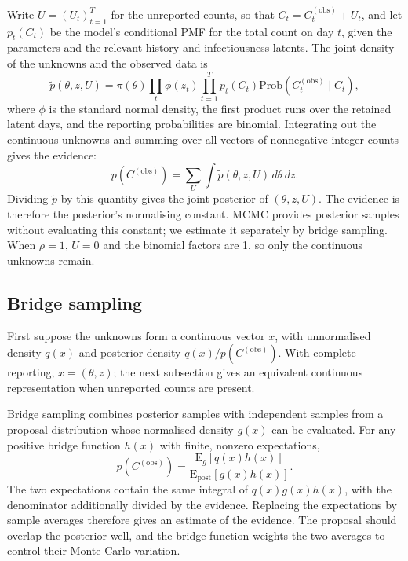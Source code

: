 \documentclass{article}
\newcommand{\Prob}[1]{\mathrm{Prob}\left(#1\right)}
\begin{document}
Write \(U=(U_t)_{t=1}^{T}\) for the unreported counts, so that
\(C_t=C_t^{(\mathrm{obs})}+U_t\), and let \(p_t(C_t)\) be the model's
conditional PMF for the total count on day \(t\), given the parameters and
the relevant history and infectiousness latents. The joint density of the
unknowns and the observed data is
\begin{equation}
  \tilde p(\theta,z,U)=\pi(\theta)\prod_t\phi(z_t)
  \prod_{t=1}^{T}p_t(C_t)\Prob{C_t^{(\mathrm{obs})}\mid C_t},
\end{equation}
where \(\phi\) is the standard normal density, the first product runs over
the retained latent days, and the reporting probabilities are binomial.
Integrating out the continuous unknowns and summing over all vectors of
nonnegative integer counts gives the evidence:
\begin{equation}
  p\left(C^{(\mathrm{obs})}\right)
  =\sum_U\int\tilde p(\theta,z,U)\,d\theta\,dz.
\end{equation}
Dividing \(\tilde p\) by this quantity gives the joint posterior of
\((\theta,z,U)\). The evidence is therefore the posterior's normalising
constant. MCMC provides posterior samples without evaluating this constant;
we estimate it separately by bridge sampling. When \(\rho=1\), \(U=0\)
and the binomial factors are 1, so only the continuous unknowns remain.

\subsection{Bridge sampling}

First suppose the unknowns form a continuous vector \(x\), with
unnormalised density \(q(x)\) and posterior density
\(q(x)/p(C^{(\mathrm{obs})})\). With complete reporting,
\(x=(\theta,z)\); the next subsection gives an equivalent continuous
representation when unreported counts are present.

Bridge sampling combines posterior samples with independent samples from a
proposal distribution whose normalised density \(g(x)\) can be evaluated.
For any positive bridge function \(h(x)\) with finite, nonzero expectations,
\begin{equation}
  p\left(C^{(\mathrm{obs})}\right)
  =\frac{\mathrm{E}_g[q(x)h(x)]}
  {\mathrm{E}_{\mathrm{post}}[g(x)h(x)]}.
\end{equation}
The two expectations contain the same integral of \(q(x)g(x)h(x)\), with
the denominator additionally divided by the evidence. Replacing the
expectations by sample averages therefore gives an estimate of the
evidence. The proposal should overlap the posterior well, and the bridge
function weights the two averages to control their Monte Carlo variation.
\end{document}
